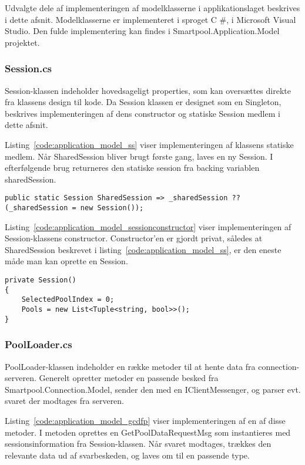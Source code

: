 Udvalgte dele af implementeringen af modelklasserne i applikationslaget beskrives i dette afsnit. Modelklasserne er implementeret i sproget C \#, i Microsoft Visual Studio. Den fulde implementering kan findes i Smartpool.Application.Model projektet.

\subsubsection{Session.cs}
Session-klassen indeholder hovedsageligt properties, som kan oversættes direkte fra klassens design til kode. Da Session klassen er designet som en Singleton, beskrives implementeringen af dens constructor og statiske Session medlem i dette afsnit.

Listing~\ref{code:application_model_ss} viser implementeringen af klassens statiske medlem. Når SharedSession bliver brugt første gang, laves en ny Session. I efterfølgende brug returneres den statiske session fra backing variablen sharedSession.

\begin{lstlisting}[caption={SharedSession},label={code:application_model_ss}]
public static Session SharedSession => _sharedSession ?? (_sharedSession = new Session());
\end{lstlisting}

Listing~\ref{code:application_model_sessionconstructor} viser implementeringen af Session-klassens constructor. Constructor'en er gjordt privat, således at SharedSession beskrevet i listing~\ref{code:application_model_ss}, er den eneste måde man kan oprette en Session.

\begin{lstlisting}[caption={Session constructor},label={code:application_model_sessionconstructor}]
private Session()
{
	SelectedPoolIndex = 0;
	Pools = new List<Tuple<string, bool>>();
}
\end{lstlisting}

\subsubsection{PoolLoader.cs}
PoolLoader-klassen indeholder en række metoder til at hente data fra connection-serveren. Generelt opretter metoder en passende besked fra Smartpool.Connection.Model, sender den med en IClientMessenger, og parser evt. svaret der modtages fra serveren.

Listing~\ref{code:application_model_gcdfp} viser implementeringen af en af disse metoder. I metoden oprettes en GetPoolDataRequestMsg som instantieres med sessionsinformation fra Session-klassen. Når svaret modtages, trækkes den relevante data ud af svarbeskeden, og laves om til en passende type.

